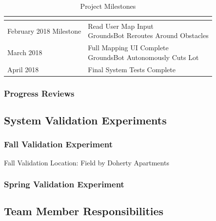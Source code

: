 \documentclass{article}
\begin{document}
\begin{table}[H]
\begin{tabular}{|l|l|}
{  }                                             \\
  \hline
February 2018 Milestone &
  \makecell[l]{
    Read User Map Input                        \\
    GroundsBot Reroutes Around Obstacles       \\
  }                                            \\
  \hline
March 2018 &
  \makecell[l]{
    Full Mapping UI Complete                   \\
    GroundsBot Autonomously Cuts Lot           \\
  }                                            \\
  \hline
April 2018 &
  \makecell[l]{
    Final System Tests Complete                \\
  }                                            \\
  \hline
\end{tabular}
\caption{Project Milestones}\label{Tab:table_milestones}
\end{table}

\subsubsection{Progress Reviews}

\subsection{System Validation Experiments}
\subsubsection{Fall Validation Experiment}
Fall Validation
Location: Field by Doherty Apartments
\subsubsection{Spring Validation Experiment}

\subsection{Team Member Responsibilities}
\end{document}
